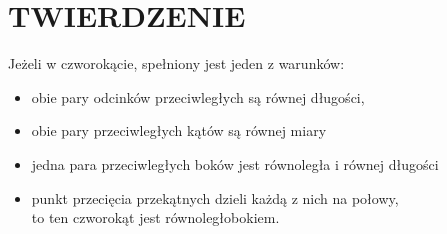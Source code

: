 \documentclass[10pt]{article}
\begin{document}
\section*{TWIERDZENIE}
Jeżeli w czworokącie, spełniony jest jeden z warunków:

\begin{itemize}
  \item obie pary odcinków przeciwległych są równej długości,
  \item obie pary przeciwległych kątów są równej miary
  \item jedna para przeciwległych boków jest równoległa i równej długości
  \item punkt przecięcia przekątnych dzieli każdą z nich na połowy,\\
to ten czworokąt jest równoległobokiem.
\end{itemize}
\end{document}
